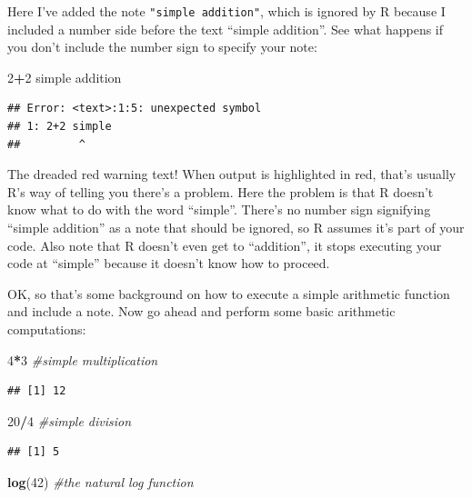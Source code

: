 \documentclass[
]{book}
\newenvironment{Shaded}{\begin{snugshade}}{\end{snugshade}}
\newcommand{\CommentTok}[1]{\textcolor[rgb]{0.56,0.35,0.01}{\textit{#1}}}
\newcommand{\DecValTok}[1]{\textcolor[rgb]{0.00,0.00,0.81}{#1}}
\newcommand{\FunctionTok}[1]{\textcolor[rgb]{0.13,0.29,0.53}{\textbf{#1}}}
\newcommand{\NormalTok}[1]{#1}
\newcommand{\SpecialCharTok}[1]{\textcolor[rgb]{0.81,0.36,0.00}{\textbf{#1}}}
\begin{document}
Here I've added the note \texttt{"simple\ addition"}, which is ignored by R because I included a number side before the text ``simple addition''. See what happens if you don't include the number sign to specify your note:

\begin{Shaded}
\begin{Highlighting}[]
\DecValTok{2}\SpecialCharTok{+}\DecValTok{2}\NormalTok{ simple addition}
\end{Highlighting}
\end{Shaded}

\begin{verbatim}
## Error: <text>:1:5: unexpected symbol
## 1: 2+2 simple
##         ^
\end{verbatim}

The dreaded red warning text! When output is highlighted in red, that's usually R's way of telling you there's a problem. Here the problem is that R doesn't know what to do with the word ``simple''. There's no number sign signifying ``simple addition'' as a note that should be ignored, so R assumes it's part of your code. Also note that R doesn't even get to ``addition'', it stops executing your code at ``simple'' because it doesn't know how to proceed.

OK, so that's some background on how to execute a simple arithmetic function and include a note. Now go ahead and perform some basic arithmetic computations:

\begin{Shaded}
\begin{Highlighting}[]
\DecValTok{4}\SpecialCharTok{*}\DecValTok{3} \CommentTok{\#simple multiplication}
\end{Highlighting}
\end{Shaded}

\begin{verbatim}
## [1] 12
\end{verbatim}

\begin{Shaded}
\begin{Highlighting}[]
\DecValTok{20}\SpecialCharTok{/}\DecValTok{4} \CommentTok{\#simple division}
\end{Highlighting}
\end{Shaded}

\begin{verbatim}
## [1] 5
\end{verbatim}

\begin{Shaded}
\begin{Highlighting}[]
\FunctionTok{log}\NormalTok{(}\DecValTok{42}\NormalTok{) }\CommentTok{\#the natural log function}
\end{Highlighting}
\end{Shaded}
\end{document}

